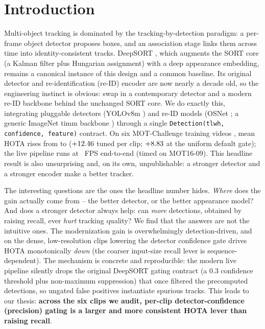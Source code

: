 \section{Introduction}
\label{sec:intro}

Multi-object tracking is dominated by the tracking-by-detection paradigm: a per-frame object detector
proposes boxes, and an association stage links them across time into identity-consistent tracks. DeepSORT
\cite{wojke2017deepsort}, which augments the SORT core \cite{bewley2016sort} (a Kalman filter plus
Hungarian assignment) with a deep appearance embedding, remains a canonical instance of this design and a
common baseline. Its original detector and re-identification (re-ID) encoder are now nearly a decade old, so
the engineering instinct is obvious: swap in a contemporary detector and a modern re-ID backbone behind the
unchanged SORT core. We do exactly this, integrating pluggable detectors (YOLOv8m \cite{jocher2023yolov8})
and re-ID models (OSNet \cite{zhou2019osnet}; a generic ImageNet timm backbone \cite{wightman2019timm})
through a single \texttt{Detection(tlwh, confidence, feature)} contract. On six MOT-Challenge training videos
\cite{leal2015mot15,milan2016mot16}, mean HOTA \cite{luiten2021hota,luiten2020trackeval} rises from
\baselineHOTA{} to \modernHOTA{} ($+12.46$ tuned per clip; $+8.83$ at the uniform
default gate); the live pipeline runs at \fpsRealtime{}~FPS
end-to-end (timed on MOT16-09). This headline result is also
unsurprising and, on its own, unpublishable: a stronger detector and a stronger encoder make a better
tracker.

The interesting questions are the ones the headline number hides. \emph{Where} does the gain actually come
from -- the better detector, or the better appearance model? And does a stronger detector always help: can
\emph{more} detections, obtained by raising recall, ever \emph{hurt} tracking quality? We find that the
answers are not the intuitive ones. The modernization gain is overwhelmingly detection-driven, and on the dense,
low-resolution clips lowering the detector confidence gate drives HOTA monotonically \emph{down} (the
coarser input-size recall lever is sequence-dependent). The
mechanism is concrete and reproducible: the modern live pipeline silently drops the original DeepSORT gating
contract (a $0.3$ confidence threshold plus non-maximum suppression) that once filtered the precomputed
detections, so ungated false positives instantiate spurious tracks. This leads to our thesis:
\textbf{across the six clips we audit, per-clip detector-confidence (precision) gating is a larger and
more consistent HOTA lever than raising recall}.

